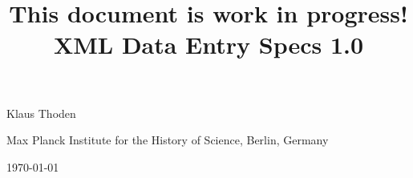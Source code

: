 \documentclass[fontsize=11pt, paper=a4,
twoside, %
DIV15,
headings=normal,
parskip=half-,
numbers=noenddot]{scrartcl}
\begin{document}
\title{This document is work in progress!\\
XML Data Entry Specs 1.0}
\date{}
\author{}
\maketitle
\vspace{-20mm}

\begin{center}
\large Klaus Thoden

\normalsize Max Planck Institute for the History of Science, Berlin, Germany

\today
\end{center}

\tableofcontents
\listoftodos

\newpage



\end{document}
